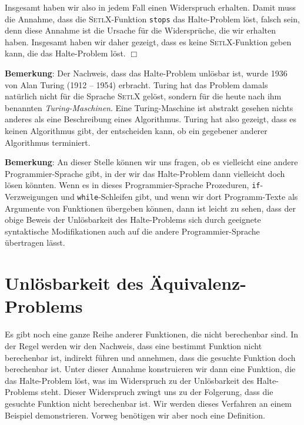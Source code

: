 Insgesamt haben wir also in jedem Fall einen Widerspruch erhalten.  
Damit muss die Annahme, dass die \textsc{SetlX}-Funktion \texttt{stops}
das Halte-Problem löst, falsch sein, denn diese Annahme ist die Ursache für die Widersprüche, die
wir erhalten haben.  Insgesamt haben wir daher gezeigt, dass es keine \textsc{SetlX}-Funktion
geben kann, die das Halte-Problem löst. \hspace*{\fill} $\Box$
\vspace*{0.3cm}

\noindent
\textbf{Bemerkung}:
Der Nachweis, dass das Halte-Problem unlösbar ist, wurde 1936 von Alan Turing (1912 -- 1954)
\cite{turing:36} erbracht.  Turing hat das Problem damals natürlich nicht für die Sprache
\textsc{SetlX} gelöst, sondern für die heute nach ihm benannten \emph{Turing-Maschinen}.  
Eine Turing-Maschine ist abstrakt gesehen nichts anderes als eine Beschreibung eines
Algorithmus.  Turing hat also gezeigt, dass es keinen Algorithmus gibt, der entscheiden
kann, ob ein gegebener anderer Algorithmus terminiert.
\vspace*{0.3cm}

\noindent
\textbf{Bemerkung}:
An dieser Stelle können wir uns fragen, ob es vielleicht eine andere Programmier-Sprache
gibt, in der wir das Halte-Problem dann vielleicht doch lösen könnten.  
Wenn es in dieses Programmier-Sprache Prozeduren, \texttt{if}-Verzweigungen und
\texttt{while}-Schleifen gibt, und wenn wir dort 
Programm-Texte als Argumente von Funktionen übergeben können, dann ist leicht zu sehen,
dass der obige Beweis der 
Unlösbarkeit des Halte-Problems sich durch geeignete syntaktische Modifikationen auch auf
die andere Programmier-Sprache übertragen lässt.


\section{Unlösbarkeit des Äquivalenz-Problems}
Es gibt noch eine ganze Reihe anderer Funktionen, die nicht berechenbar sind.  In der
Regel werden wir den Nachweis, dass eine bestimmt Funktion nicht berechenbar ist, indirekt führen
und annehmen, dass die gesuchte Funktion doch berechenbar ist.  Unter dieser Annahme
konstruieren wir dann eine Funktion, die das Halte-Problem löst, was im Widerspruch zu der Unlösbarkeit
des Halte-Problems steht.
Dieser Widerspruch zwingt uns zu der Folgerung, dass die gesuchte Funktion nicht berechenbar ist.
Wir werden dieses Verfahren an einem Beispiel demonstrieren.  Vorweg benötigen wir aber
noch eine Definition.


